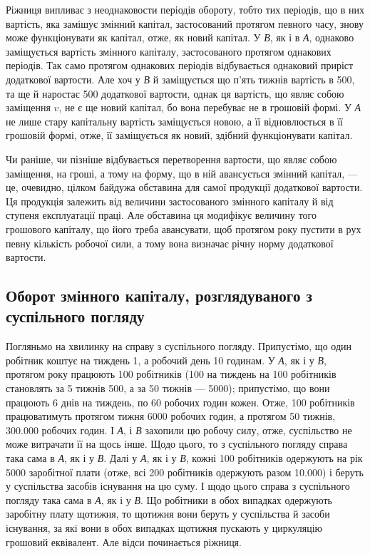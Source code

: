 
Ріжниця випливає з неоднаковости періодів обороту, тобто тих періодів,
що в них вартість, яка замішує змінний капітал, застосований протягом
певного часу, знову може функціонувати як капітал, отже, як новий
капітал. У \emph{В}, як і в \emph{А}, однаково заміщується вартість змінного капіталу,
застосованого протягом однакових періодів. Так само протягом однакових
періодів відбувається однаковий приріст додаткової вартости. Але хоч у
\emph{В} й заміщується що п’ять тижнів вартість в 500, та ще й наростає
500 додаткової вартости, однак ця вартість, що являє собою
заміщення $v$, не є ще новий капітал, бо вона перебуває не в грошовій
формі. У \emph{А} не лише стару капітальну вартість заміщується новою, а її
відновлюється в її грошовій формі, отже, її заміщується як новий, здібний
функціонувати капітал.

Чи раніше, чи пізніше відбувається перетворення вартости, що являє
собою заміщення, на гроші, а тому на форму, що в ній авансується
змінний капітал, — це, очевидно, цілком байдужа обставина для самої
продукції додаткової вартости. Ця продукція залежить від величини застосованого
змінного капіталу й від ступеня експлуатації праці. Але обставина
ця модифікує величину того грошового капіталу, що його треба
авансувати, щоб протягом року пустити в рух певну кількість робочої
сили, а тому вона визначає річну норму додаткової вартости.

\subsection{Оборот змінного капіталу, розглядуваного з суспільного погляду}

Погляньмо на хвилинку на справу з суспільного погляду. Припустімо,
що один робітник коштує на тиждень 1, а робочий день \deq{} 10 годинам.
У \emph{А}, як і у \emph{В}, протягом року працюють 100 робітників (100 на тиждень на 100 робітників становлять за 5 тижнів 500, а
за 50 тижнів — 5000); припустімо, що вони працюють 6 днів на
тиждень, по 60 робочих годин кожен. Отже, 100 робітників працюватимуть
протягом тижня 6000 робочих годин, а протягом 50 тижнів, \num{300.000} робочих
годин. І \emph{А}, і \emph{В} захопили цю робочу силу, отже, суспільство не може витрачати
її на щось інше. Щодо цього, то з суспільного погляду справа
така сама в \emph{А}, як і у \emph{В}. Далі у \emph{А}, як і у \emph{В}, кожні 100 робітників одержують
на рік 5000 заробітної плати (отже, всі 200 робітників
одержують разом \num{10.000}) і беруть у суспільства засобів існування
на цю суму. І щодо цього справа з суспільного погляду така сама в
\emph{А}, як і у \emph{В}. Що робітники в обох випадках одержують заробітну плату
щотижня, то щотижня вони беруть у суспільства й засоби існування, за
які вони в обох випадках щотижня пускають у циркуляцію грошовий
еквівалент. Але відси починається ріжниця.

